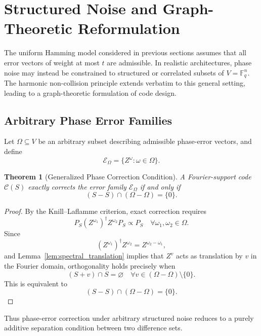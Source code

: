 \documentclass[a4paper,twocolumn,11pt,allowtoday]{quantumarticle}
\theoremstyle{plain}
\newtheorem{theorem}{Theorem}[section]
\theoremstyle{definition}
\theoremstyle{remark}
\begin{document}
\section{Structured Noise and Graph-Theoretic Reformulation}
\label{sec:graph_reformulation}

The uniform Hamming model considered in previous sections assumes that all
error vectors of weight at most $t$ are admissible. 
In realistic architectures, phase noise may instead be constrained to
structured or correlated subsets of $V=\mathbb{F}_q^n$.
The harmonic non-collision principle extends verbatim to this general setting,
leading to a graph-theoretic formulation of code design.

\subsection{Arbitrary Phase Error Families}
\label{subsec:arbitrary_phase}

Let $\Omega \subseteq V$ be an arbitrary subset describing admissible
phase-error vectors, and define
\[
\mathcal{E}_\Omega
=
\{ Z^\omega : \omega \in \Omega \}.
\]

\begin{theorem}[Generalized Phase Correction Condition]
\label{thm:general_phase_condition}
A Fourier-support code $\mathcal{C}(S)$ exactly corrects the error family
$\mathcal{E}_\Omega$ if and only if
\[
(S-S)\cap(\Omega-\Omega)=\{0\}.
\]
\end{theorem}

\begin{proof}
By the Knill--Laflamme criterion, exact correction requires
\[
P_S (Z^{\omega_1})^\dagger Z^{\omega_2} P_S \propto P_S
\quad
\forall \omega_1,\omega_2 \in \Omega.
\]
Since
\[
(Z^{\omega_1})^\dagger Z^{\omega_2} = Z^{\omega_2-\omega_1},
\]
and Lemma~\ref{lem:spectral_translation} implies that $Z^v$ acts as
translation by $v$ in the Fourier domain, orthogonality holds precisely
when
\[
(S+v)\cap S = \varnothing
\quad
\forall v \in (\Omega-\Omega)\setminus\{0\}.
\]
This is equivalent to
\[
(S-S)\cap(\Omega-\Omega)=\{0\}.
\]
\end{proof}

Thus phase-error correction under arbitrary structured noise reduces to a
purely additive separation condition between two difference sets.




\end{document}
